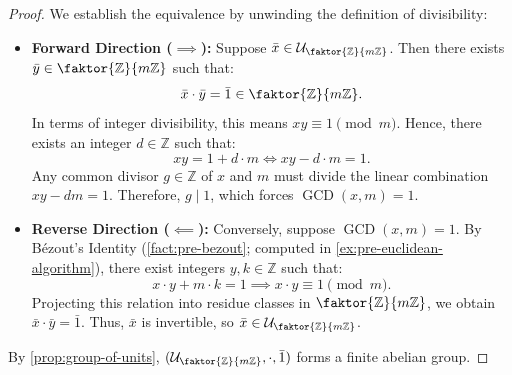 \begin{content}

\begin{proof}
We establish the equivalence by unwinding the definition of divisibility:
\begin{itemize}
    \item \textbf{Forward Direction ($\implies$):} Suppose $\bar{x} \in \mathcal{U}_{\faktor{\mathbb{Z}}{m\mathbb{Z}}}$. Then there exists $\bar{y} \in \faktor{\mathbb{Z}}{m\mathbb{Z}}$ such that:
    \[
    \bar{x} \cdot \bar{y} = \bar{1} \in \faktor{\mathbb{Z}}{m\mathbb{Z}}.
    \]
    In terms of integer divisibility, this means $x y \equiv 1 \pmod m$. Hence, there exists an integer $d \in \mathbb{Z}$ such that:
    \[
    x y = 1 + d \cdot m \iff x y - d \cdot m = 1.
    \]
    Any common divisor $g \in \mathbb{Z}$ of $x$ and $m$ must divide the linear combination $x y - d m = 1$. Therefore, $g \mid 1$, which forces $\operatorname{GCD}(x, m) = 1$.
    \item \textbf{Reverse Direction ($\impliedby$):} Conversely, suppose $\operatorname{GCD}(x, m) = 1$. By Bézout's Identity (\cref{fact:pre-bezout}; computed in \cref{ex:pre-euclidean-algorithm}), there exist integers $y, k \in \mathbb{Z}$ such that:
    \[
    x \cdot y + m \cdot k = 1 \implies x \cdot y \equiv 1 \pmod m.
    \]
    Projecting this relation into residue classes in $\faktor{\mathbb{Z}}{m\mathbb{Z}}$, we obtain $\bar{x} \cdot \bar{y} = \bar{1}$. Thus, $\bar{x}$ is invertible, so $\bar{x} \in \mathcal{U}_{\faktor{\mathbb{Z}}{m\mathbb{Z}}}$.
\end{itemize}
By \cref{prop:group-of-units}, $(\mathcal{U}_{\faktor{\mathbb{Z}}{m\mathbb{Z}}}, \cdot, \bar{1})$ forms a finite abelian group.
\end{proof}
\end{content}

